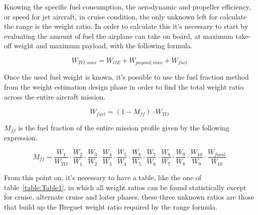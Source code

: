 \documentclass[a4paper,12pt,oneside]{book}
\begin{document}
\bigskip
Knowing the specific fuel consumption, the aerodynamic and propeller efficiency, or speed for jet aircraft, in cruise condition, the only unknown left for calculate the range is the weight ratio. In order to calculate this it’s necessary to start by evaluating the amount of fuel the airplane can take on board, at maximum take-off weight and maximum payload, with the following formula.

\begin{equation}
W_{TO,max}=W_{OE}+W_{payoad,max}+W_{fuel}
\label{eqn:Equation1.3}
\end{equation}

\bigskip
Once the used fuel weight is known, it’s possible to use the fuel fraction method from the weight estimation design phase in order to find the total weight ratio across the entire aircraft mission. 

\begin{equation}
W_{fuel}=\left(1-M_{ff}\right)\cdot W_{TO}
\label{eqn:Equation1.4}
\end{equation}

\bigskip
$M_{ff}$ is the fuel fraction of the entire mission profile given by the following expression.

\begin{equation}
M_{ff}=\frac{W_1}{W_{TO}}\cdot 
	   \frac{W_2}{W_{1}}\cdot
	   \frac{W_3}{W_{2}}\cdot 
	   \frac{W_4}{W_{3}}\cdot 
	   \frac{W_5}{W_{4}}\cdot 
	   \frac{W_6}{W_{5}}\cdot 
	   \frac{W_7}{W_{6}}\cdot 
	   \frac{W_8}{W_{7}}\cdot 
	   \frac{W_9}{W_{8}}\cdot 
	   \frac{W_{10}}{W_{9}}\cdot 
	   \frac{W_{fianl}}{W_{10}} 
	   \label{eqn:Equation1.5} 
\end{equation}

\bigskip
From this point on, it’s necessary to have a table, like the one of table~\ref{table:Table1}, in which all weight ratios can be found statistically except for cruise, alternate cruise and loiter phases; these three unknown ratios are those that build up the Breguet weight ratio required by the range formula.   
\end{document}

